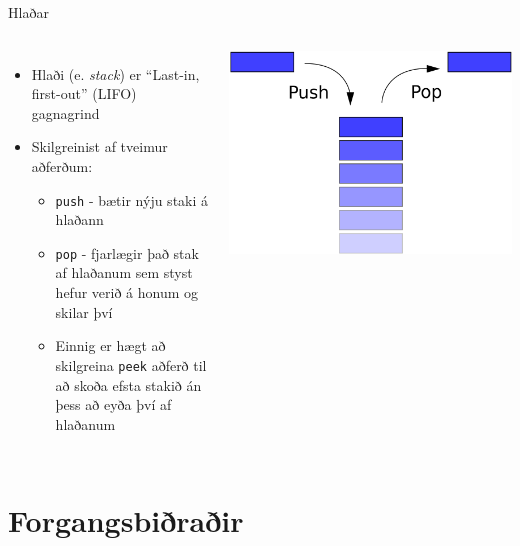 \documentclass{beamer}
\begin{document}
\begin{frame}{Hlaðar}
\begin{columns}[c]
\begin{itemize}
 \item Hlaði (e. \emph{stack}) er ``Last-in, first-out'' (LIFO) gagnagrind
 \item Skilgreinist af tveimur aðferðum:
 \begin{itemize}
  \item \texttt{push} - bætir nýju staki á hlaðann
  \item \texttt{pop} - fjarlægir það stak af hlaðanum sem styst hefur verið á honum og skilar því
  \item Einnig er hægt að skilgreina \texttt{peek} aðferð til að skoða efsta stakið án þess að eyða því af hlaðanum
 \end{itemize}
\end{itemize}
\includegraphics[width=\linewidth]{Pics/stack}
\end{columns}
\end{frame}

\section{Forgangsbiðraðir}
\end{document}

